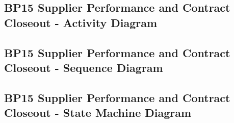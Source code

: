 \documentclass[conference]{IEEEtran}
\begin{document}
\subsection*{BP15 Supplier Performance and Contract Closeout - Activity Diagram}



\subsection*{BP15 Supplier Performance and Contract Closeout - Sequence Diagram}



\subsection*{BP15 Supplier Performance and Contract Closeout - State Machine Diagram}

\end{document}
